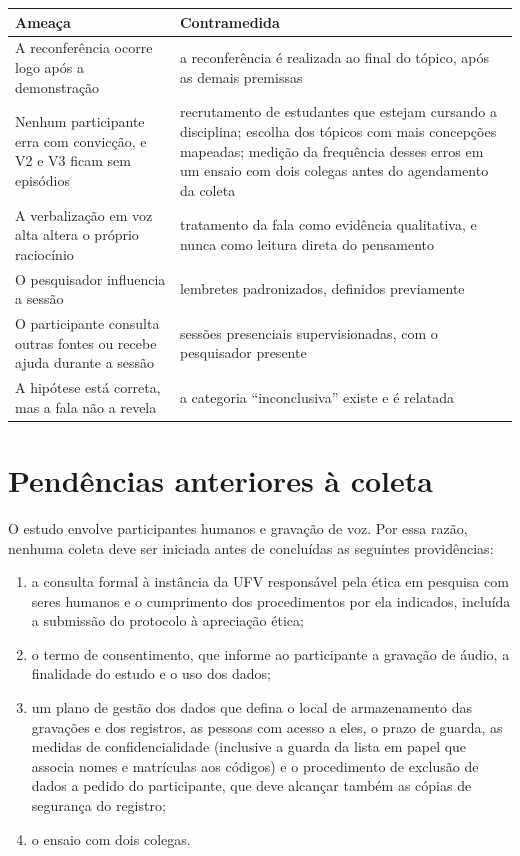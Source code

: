 \begin{quadro}[htbp]
\caption{Ameaças à validade e contramedidas}\label{qua:A-3}
\footnotesize
\begin{tabularx}{\textwidth}{|X|X|}
\hline
\textbf{Ameaça} & \textbf{Contramedida} \\ \hline
A reconferência ocorre logo após a demonstração & a reconferência é realizada ao final do tópico, após as demais premissas \\ \hline
Nenhum participante erra com convicção, e V2 e V3 ficam sem episódios & recrutamento de estudantes que estejam cursando a disciplina; escolha dos tópicos com mais concepções mapeadas; medição da frequência desses erros em um ensaio com dois colegas antes do agendamento da coleta \\ \hline
A verbalização em voz alta altera o próprio raciocínio & tratamento da fala como evidência qualitativa, e nunca como leitura direta do pensamento \\ \hline
O pesquisador influencia a sessão & lembretes padronizados, definidos previamente \\ \hline
O participante consulta outras fontes ou recebe ajuda durante a sessão & sessões presenciais supervisionadas, com o pesquisador presente \\ \hline
A hipótese está correta, mas a fala não a revela & a categoria ``inconclusiva'' existe e é relatada \\ \hline
\end{tabularx}
\end{quadro}

\section{Pendências anteriores à coleta}

O estudo envolve participantes humanos e gravação de voz. Por essa razão, nenhuma coleta deve ser iniciada antes de concluídas as seguintes providências:

\begin{enumerate}
\item a consulta formal à instância da UFV responsável pela ética em pesquisa com seres humanos e o cumprimento dos procedimentos por ela indicados, incluída a submissão do protocolo à apreciação ética;
\item o termo de consentimento, que informe ao participante a gravação de áudio, a finalidade do estudo e o uso dos dados;
\item um plano de gestão dos dados que defina o local de armazenamento das gravações e dos registros, as pessoas com acesso a eles, o prazo de guarda, as medidas de confidencialidade (inclusive a guarda da lista em papel que associa nomes e matrículas aos códigos) e o procedimento de exclusão de dados a pedido do participante, que deve alcançar também as cópias de segurança do registro;
\item o ensaio com dois colegas.
\end{enumerate}
